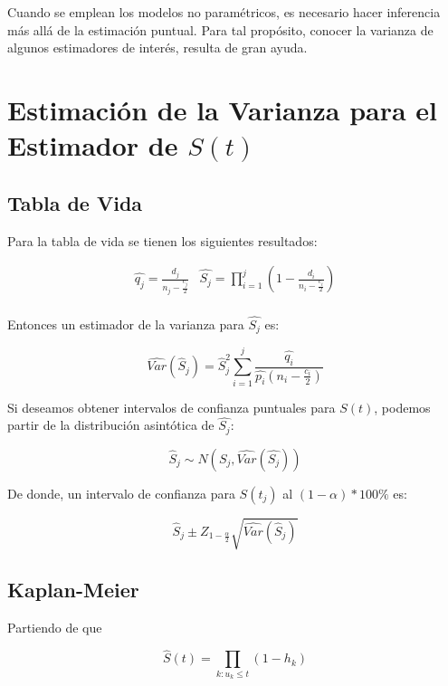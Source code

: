 \documentclass[
  a4paper,
  oneside,
  openany]{book}
\begin{document}
Cuando se emplean los modelos no paramétricos, es necesario hacer inferencia más allá de la estimación puntual. Para tal propósito, conocer la varianza de algunos estimadores de interés, resulta de gran ayuda.

\hypertarget{estimaciuxf3n-de-la-varianza-para-el-estimador-de-st}{%
\section{\texorpdfstring{Estimación de la Varianza para el Estimador de \(S(t)\)}{Estimación de la Varianza para el Estimador de S(t)}}\label{estimaciuxf3n-de-la-varianza-para-el-estimador-de-st}}

\hypertarget{tabla-de-vida}{%
\subsection{Tabla de Vida}\label{tabla-de-vida}}

Para la tabla de vida se tienen los siguientes resultados:

\[
\begin{array}{ll}
\hat{q_j} = \frac{d_{j}}{n_{j}-\frac{c_{j}}{2}} &  \hat{S_{j}}=\prod_{i=1}^{j}\left(1-\frac{d_{i}}{n_{i}-\frac{c_{i}}{2}}\right)\\
\end{array}
\]

Entonces un estimador de la varianza para \(\hat{S_j}\) es:

\[
 \hat{Var}(\hat{S}_{j}) = \hat{S}_{j}^2\sum_{i = 1}^{j}\frac{\hat{q_i}}{\hat{p_i}(n_{i}-\frac{c_{i}}{2})}
\]

Si deseamos obtener intervalos de confianza puntuales para \(S(t)\), podemos partir de la distribución asintótica de \(\hat{S_j}\):

\[
\hat{S}_j \sim N(S_{j}, \hat{Var}(\hat{S_{j}}))
\]

De donde, un intervalo de confianza para \(S(t_j)\) al \((1-\alpha)*100\%\) es:

\[
\hat S_j \pm Z_{1-\frac{\alpha}{2}} \sqrt{\hat{Var}(\hat S_j)}
\]

\hypertarget{kaplan-meier}{%
\subsection{Kaplan-Meier}\label{kaplan-meier}}

Partiendo de que

\[
\hat{S}(t) = \prod_{k:u_k \leq t}(1-h_{k})
\]
\end{document}
